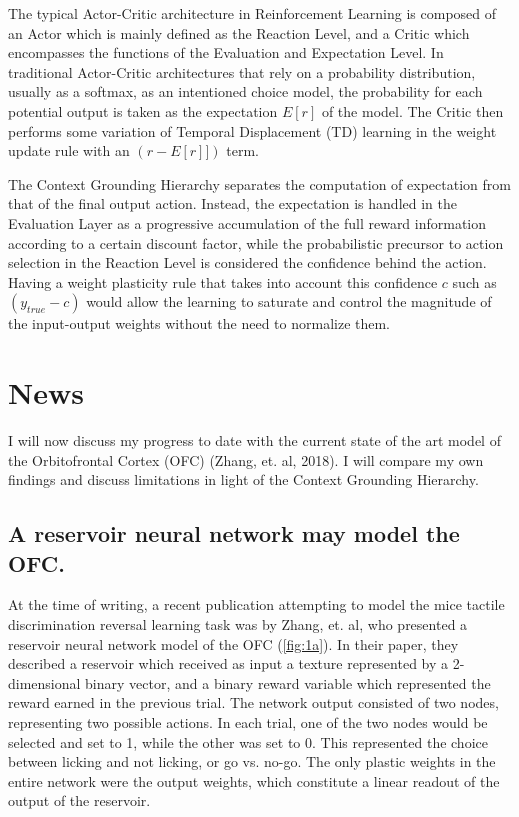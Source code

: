 \documentclass[11pt]{article}
\begin{document}
The typical Actor-Critic architecture in Reinforcement Learning is composed of an Actor which is mainly defined as the Reaction Level, and a Critic which encompasses the functions of the Evaluation and Expectation Level.  In traditional Actor-Critic architectures that rely on a probability distribution, usually as a softmax, as an intentioned choice model, the probability for each potential output is taken as the expectation $E[r]$ of the model.  The Critic then performs some variation of Temporal Displacement (TD) learning in the weight update rule with an $(r - E[r]])$ term.  

The Context Grounding Hierarchy separates the computation of expectation from that of the final output action.  Instead, the expectation is handled in the Evaluation Layer as a progressive accumulation of the full reward information according to a certain discount factor, while the probabilistic precursor to action selection in the Reaction Level is considered the confidence behind the action.  Having a weight plasticity rule that takes into account this confidence $c$ such as $(y_{true} - c)$ would allow the learning to saturate and control the magnitude of the input-output weights without the need to normalize them.

\section{News}
I will now discuss my progress to date with the current state of the art model of the Orbitofrontal Cortex (OFC) (Zhang, et. al, 2018).  I will compare my own findings and discuss limitations in light of the Context Grounding Hierarchy.

\subsection{A reservoir neural network may model the OFC.}
At the time of writing, a recent publication attempting to model the mice tactile discrimination reversal learning task was by Zhang, et. al, who presented a reservoir neural network model of the OFC (\autoref{fig:1a}).  In their paper, they described a reservoir which received as input a texture represented by a 2-dimensional binary vector, and a binary reward variable which represented the reward earned in the previous trial.  The network output consisted of two nodes, representing two possible actions.  In each trial, one of the two nodes would be selected and set to 1, while the other was set to 0.  This represented the choice between licking and not licking, or go vs. no-go.  The only plastic weights in the entire network were the output weights, which constitute a linear readout of the output of the reservoir.
\end{document}
